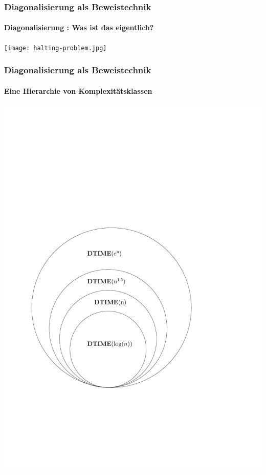 \begin{frame}
	\frametitle{Diagonalisierung als Beweistechnik}
	\framesubtitle{Diagonalisierung : Was ist das eigentlich?}
	
	\texttt{[image: halting-problem.jpg]}
\end{frame}
\begin{frame}
	\frametitle{Diagonalisierung als Beweistechnik}
	\framesubtitle{Eine Hierarchie von Komplexitätsklassen}
	\includegraphics[scale=0.5]{images/timehierarchy.pdf}
\end{frame}
